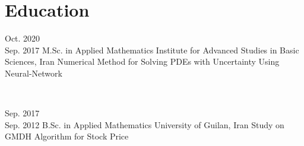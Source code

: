 \documentclass[10pt, a4paper]{article}
\begin{document}
	\section*{Education} 
	\eduEntry
	{Oct. 2020\\Sep. 2017}
	{M.Sc. in Applied Mathematics}
	{Institute for Advanced Studies in Basic Sciences, Iran}
	{Numerical Method for Solving PDEs with Uncertainty Using Neural-Network}
	{ 
		
		 \\
	}
	
	\eduEntry
	{Sep. 2017\\Sep. 2012}
	{B.Sc. in Applied Mathematics}
	{University of Guilan, Iran}
	{Study on GMDH Algorithm for Stock Price}
	{ 
	}
	
	
	
	
	
	
	
	
	
	
\end{document}
